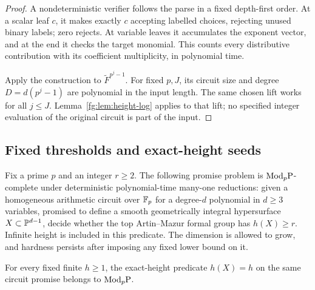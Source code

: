 \begin{proof}
A nondeterministic verifier follows the parse in a fixed depth-first
order. At a scalar leaf $c$, it makes exactly $c$ accepting labelled
choices, rejecting unused binary labels; zero rejects. At variable
leaves it accumulates the exponent vector, and at the end it checks
the target monomial. This counts every distributive contribution with
its coefficient multiplicity, in polynomial time.

Apply the construction to $\widetilde F^{p^j-1}$. For fixed $p,J$,
its circuit size and degree $D=d(p^j-1)$ are polynomial in the input
length. The same chosen lift works for all $j\le J$.
Lemma~\ref{fg:lem:height-log} applies to that lift; no specified
integer evaluation of the original circuit is part of the input.
\end{proof}

\subsection{Fixed thresholds and exact-height seeds}
\begin{theorem}
\label{fg:thm:threshold}
Fix a prime $p$ and an integer $r\ge2$. The following promise problem
is $\mathrm{Mod}_p\mathrm P$-complete under deterministic polynomial-time many-one
reductions: given a homogeneous arithmetic circuit over $\mathbb F_p$ for a
degree-$d$ polynomial in $d\ge3$ variables, promised to define a smooth
geometrically integral hypersurface $X\subset\mathbb P^{d-1}$, decide whether
the top Artin--Mazur formal group has $h(X)\ge r$.
Infinite height is included in this predicate. The dimension is
allowed to grow, and hardness persists after imposing any fixed lower
bound on it.

For every fixed finite $h\ge1$, the exact-height predicate $h(X)=h$
on the same circuit promise belongs to $\mathrm{Mod}_p\mathrm P$.
\end{theorem}

